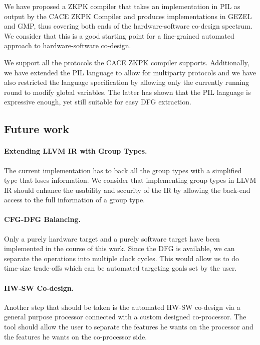 We have proposed a ZKPK compiler that takes an implementation in PIL
as output by the CACE ZKPK Compiler and produces implementations in
GEZEL and GMP, thus covering both ends of the hardware-software
co-design spectrum. We consider that this is a good starting point for
a fine-grained automated approach to hardware-software co-design.

We support all the protocols the CACE ZKPK compiler
supports. Additionally, we have extended the PIL language to allow for
multiparty protocols and we have also restricted the language
specification by allowing only the currently running round to modify
global variables. The latter has shown that the PIL language is
expressive enough, yet still suitable for easy DFG extraction.

\subsection{Future work}

\paragraph{Extending LLVM IR with Group Types.}
The current implementation has to back all the group types with a
simplified type that loses information. We consider that implementing
group types in LLVM IR should enhance the usability and security of
the IR by allowing the back-end access to the full information of
a group type.

\paragraph{CFG-DFG Balancing.}
Only a purely hardware target and a purely software target have been
implemented in the course of this work. Since the DFG is available, we
can separate the operations into multiple clock cycles. This would
allow us to do time-size trade-offs which can be automated targeting
goals set by the user.

\paragraph{HW-SW Co-design.}
Another step that should be taken is the automated HW-SW co-design via
a general purpose processor connected with a custom designed
co-processor. The tool should allow the user to separate the features
he wants on the processor and the features he wants on the
co-processor side.

